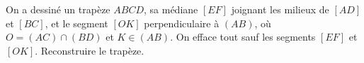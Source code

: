 On a dessiné un trapèze $ABCD$, sa médiane $[EF]$ joignant les milieux de $[AD]$ et $[BC]$, et le segment $[OK]$ perpendiculaire à $(AB)$, où $O = (AC) \cap (BD)$ et $K \in (AB)$. On efface tout sauf les segments $[EF]$ et $[OK]$. Reconstruire le trapèze.
